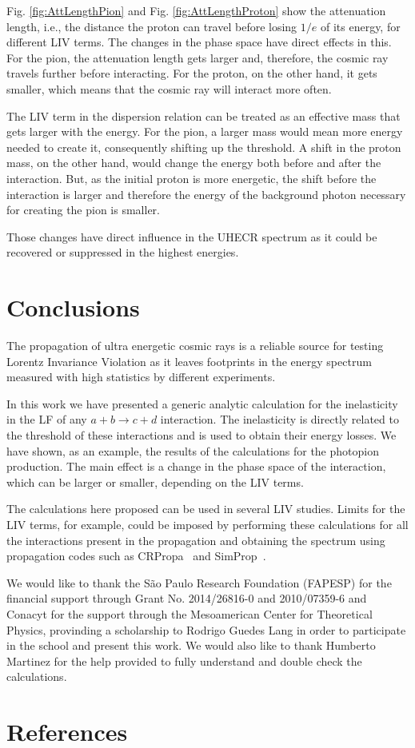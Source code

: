 \documentclass[a4paper]{jpconf}
\begin{document}
Fig. \ref{fig:AttLengthPion} and Fig. \ref{fig:AttLengthProton} show the attenuation length, i.e., the distance the proton can travel before losing $1/e$ of its energy, for different LIV terms. The changes in the phase space have direct effects in this. For the pion, the attenuation length gets larger and, therefore, the cosmic ray travels further before interacting. For the proton, on the other hand, it gets smaller, which means that the cosmic ray will interact more often.

The LIV term in the dispersion relation can be treated as an effective mass that gets larger with the energy. For the pion, a larger mass would mean more energy needed to create it, consequently shifting up the threshold. A shift in the proton mass, on the other hand, would change the energy both before and after the interaction. But, as the initial proton is more energetic, the shift before the interaction is larger and therefore the energy of the background photon necessary for creating the pion is smaller.

Those changes have direct influence in the UHECR spectrum as it could be recovered or suppressed in the highest energies.

\section{Conclusions}

The propagation of ultra energetic cosmic rays is a reliable source for testing Lorentz Invariance Violation as it leaves footprints in the energy spectrum measured with high statistics by different experiments.

In this work we have presented a generic analytic calculation for the inelasticity in the LF of any $a + b \rightarrow c + d$ interaction. The inelasticity is directly related to the threshold of these interactions and is used to obtain their energy losses. We have shown, as an example, the results of the calculations for the photopion production. The main effect is a change in the phase space of the interaction, which can be larger or smaller, depending on the LIV terms.

The calculations here proposed can be used in several LIV studies. Limits for the LIV terms, for example, could be imposed by performing these calculations for all the interactions present in the propagation and obtaining the spectrum using propagation codes such as CRPropa~\cite{CRPropa3} and SimProp~\cite{SimProp}.

\ack
We would like to thank the S\~ao Paulo Research Foundation (FAPESP) for the financial support through Grant No. 2014/26816-0 and 2010/07359-6 and Conacyt for the support through the Mesoamerican Center for Theoretical Physics, provinding a scholarship to Rodrigo Guedes Lang in order to participate in the school and present this work. We would also like to thank Humberto Martinez for the help provided to fully understand and double check the calculations.


\section*{References}

\end{document}
